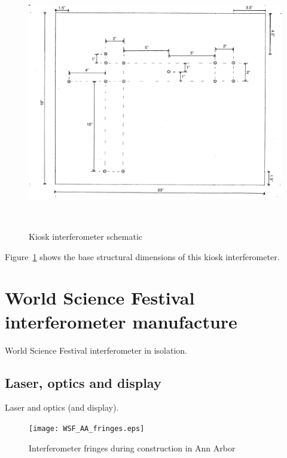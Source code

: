         \begin{figure}
        \begin{center}
        \includegraphics[height=111mm, width=148mm]{ifo_schematic.eps}
        \caption{Kiosk interferometer schematic}
        \label{kiosk_ifo_schematic}
        \end{center}
        \end{figure}

Figure~\ref{kiosk_ifo_schematic} shows the base structural dimensions of this kiosk interferometer.


    \section{World Science Festival interferometer manufacture}
    \label{manufacture}

        World Science Festival interferometer in isolation.

    


        \subsection{Laser, optics and display}
        \label{laser_display}

            Laser and optics (and display).

	\begin{figure}
	\begin{center}
	\texttt{[image: WSF\_AA\_fringes.eps]}
	\caption{Interferometer fringes during construction in Ann Arbor}
	\label{WSF_AA_fringes}
	\end{center}
	\end{figure}


